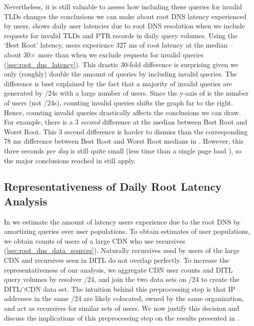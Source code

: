 \documentclass[sigconf,letterpaper,nonacm,10pt,anonymous]{acmart}
\begin{document}
Nevertheless, it is still valuable to assess how including these queries
for invalid TLDs changes the conclusions we can make about root DNS
latency experienced by users.
 shows daily user latencies
due to root DNS resolution when we include requests for invalid TLDs and
PTR records in daily query volumes. Using the `Best Root' latency, users
experience 327 ms of root latency at the median -- about 30\(\times\)
more than when we exclude requests for invalid queries
(\cref{sec:root_dns_latency}). This drastic 30-fold difference is
surprising given we only (roughly) double the amount of queries by
including invalid queries. The difference is best explained by the fact
that a majority of invalid queries are generated by /24s with a large
number of users. Since the y-axis of
 is the number of users
(not /24s), counting invalid queries shifts the graph far to the right.
Hence, counting invalid queries drastically affects the conclusions we
can draw. For example, there is a 3 \emph{second} difference at the
median between Best Root and Worst Root. This 3 second difference is
harder to dismiss than the corresponding 78 ms difference between Best
Root and Worst Root medians in .
However, this three seconds \emph{per day} is still quite small (less
time than a single page load \cite{http_archive}), so the major
conclusions reached in  still apply.

\subsection{Representativeness of Daily Root Latency
Analysis}\label{representativeness-of-daily-root-latency-analysis}

\label{ap:join_by_24} In  we estimate the
amount of latency users experience due to the root DNS by amortizing
queries over user populations. To obtain estimates of user populations,
we obtain counts of users of a large CDN who use recursives
(\cref{sec:root_dns_data_sources}). Naturally recursives used by users
of the large CDN and recursives seen in DITL do not overlap perfectly.
To increase the representativeness of our analysis, we aggregate CDN
user counts and DITL query volumes by resolver /24, and join the two
data sets on /24 to create the DITL\(\cap\)CDN data set. The intuition
behind this preprocessing step is that IP addresses in the same /24 are
likely colocated, owned by the same organization, and act as recursives
for similar sets of users. We now justify this decision and discuss the
implications of this preprocessing step on the results presented in
.
\end{document}
